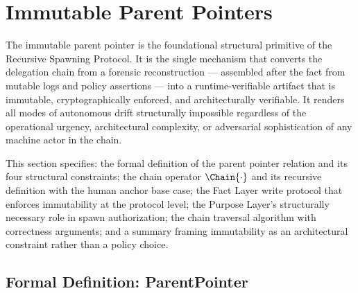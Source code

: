 \section{Immutable Parent Pointers}
\label{sec:immutable-parent-pointers}

The immutable parent pointer is the foundational structural primitive of the Recursive Spawning Protocol. It is the single mechanism that converts the delegation chain from a forensic reconstruction — assembled after the fact from mutable logs and policy assertions — into a runtime-verifiable artifact that is immutable, cryptographically enforced, and architecturally verifiable. It renders all modes of autonomous drift structurally impossible regardless of the operational urgency, architectural complexity, or adversarial sophistication of any machine actor in the chain.

This section specifies: the formal definition of the parent pointer relation and its four structural constraints; the chain operator $\Chain{\cdot}$ and its recursive definition with the human anchor base case; the Fact Layer write protocol that enforces immutability at the protocol level; the Purpose Layer's structurally necessary role in spawn authorization; the chain traversal algorithm with correctness arguments; and a summary framing immutability as an architectural constraint rather than a policy choice.

\subsection{Formal Definition: ParentPointer}
\label{sec:parent-pointer-formal}

